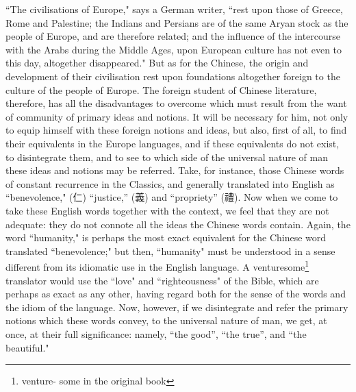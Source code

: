 ``The civilisations of Europe," says a German writer, ``rest upon those of Greece, Rome and Palestine; the Indians and Persians are of the same Aryan stock  as the people of Europe, and are therefore related; and the influence of the intercourse with the Arabs during the Middle Ages, upon European culture has not even to this day, altogether disappeared."
But as for the Chinese, the origin and development of their civilisation rest upon foundations altogether foreign to the culture of the people of Europe.
The foreign student of Chinese literature, therefore, has all the disadvantages to overcome which must result from the want of community of primary ideas and notions.
It will be necessary for him, not only to equip himself with these foreign notions and ideas, but also, first of all, to find their equivalents in the Europe languages, and if these equivalents do not exist, to disintegrate them, and to see to which side of the universal nature of man these ideas and notions may be referred.
Take, for instance, those Chinese words of constant recurrence in the Classics, and generally translated into English as ``benevolence," (仁) ``justice,'' (義) and ``propriety'' (禮).
Now when we come to take these English words together with the context, we feel that they are not adequate: they do not connote all the ideas the Chinese words contain.
Again, the word ``humanity," is perhaps the most exact equivalent for the Chinese word translated ``benevolence;" but then, ``humanity" must be understood in a sense different from its idiomatic use in the English language.
A venturesome\footnote{venture- some in the original book} translator would use the ``love" and ``righteousness" of the Bible, which are perhaps as exact as any other, having regard both for the sense of the words and the idiom of the language.
Now, however, if we disintegrate and refer the primary notions which these words convey, to the universal nature of man, we get, at once, at their full significance: namely, ``the good'', ``the true'', and ``the beautiful."

